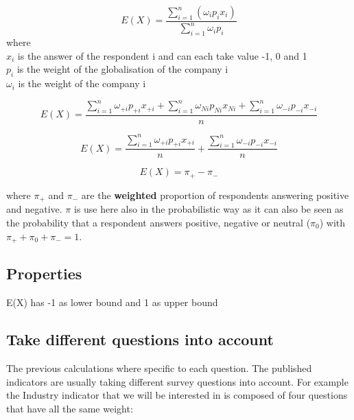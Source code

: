 \documentclass[12pt,a4paper,oneside]{book}
\begin{document}
\begin{equation}
    E(X) = \frac{ \sum_{i=1}^n \left(\omega_i p_i x_i \right)}{\sum_{i=1}^n \omega_i p_i}
\end{equation} 
where \\
$x_i$ is the answer of the respondent i and can each take value -1, 0 and 1 \\
$p_i$ is the weight of the globalisation of the company i \\
$\omega_i$ is the weight of the company i


\begin{equation}
    E(X) = \frac{ \sum_{i=1}^n \omega_{+i} p_{+i} x_{+i} + \sum_{i=1}^n \omega_{Ni} p_{Ni} x_{Ni} + \sum_{i=1}^n \omega_{-i} p_{-i} x_{-i}}{n}
\end{equation} 

\begin{equation}
    E(X) = \frac{ \sum_{i=1}^n \omega_{+i} p_{+i} x_{+i}}{n} + \frac{\sum_{i=1}^n \omega_{-i} p_{-i} x_{-i}}{n}
\end{equation} 


\begin{equation}
    E(X) = \pi_+ - \pi_-
\end{equation}

where $\pi_+$ and $\pi_-$ are the \textbf{weighted} proportion of respondents answering positive and negative. $\pi$ is use here also in the probabilistic way as it can also be seen as the probability that a respondent answers positive, negative or neutral ($\pi_0$) with $\pi_+ + \pi_0 + \pi_- =1$.




\subsection{Properties}

E(X) has -1 as lower bound and 1 as upper bound






\subsection{Take different questions into account}

The previous calculations where specific to each question. The published indicators are usually taking different survey questions into account. For example the Industry indicator that we will be interested in is composed of four questions that have all the same weight:
\end{document}
